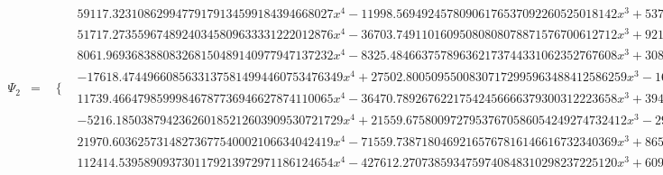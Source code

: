 \documentclass{article}
\begin{document}
\begin{landscape}
\begin{eqnarray*}
\begin{array}{cc}
\end{array}\\
\Psi_2 & = & \begin{array}{cc}
 \{ & 
\begin{array}{cc}
 59117.32310862994779179134599184394668027 x^4-11998.56949245780906176537092260525018142 x^3+537.9721485620369728655932295033721999358 x^2 & x\geq 0\land x<\frac{1}{8} \\
 51717.27355967489240345809633331222012876 x^4-36703.74911016095080808078871576700612712 x^3+9216.349827382961501968515348677776844434 x^2-953.7262380241849926958418077818647374866 x+33.67508518418548236243666551781704649959 & x\geq \frac{1}{8}\land x<\frac{1}{4} \\
 8061.969368388083268150489140977947137232 x^4-8325.484663757896362173744331062352767608 x^3+3089.228153592079377671410303461567859171 x^2-482.6334728738910681981346577849906877924 x+25.96514853070850647407671542865714078579 & x\geq \frac{1}{4}\land x<\frac{3}{8} \\
 -17618.47449660856331375814994460753476349 x^4+27502.80050955008307172995963488412586259 x^3-16161.35263230047433137450426550417233817 x^2+4257.212936828950528279529715421331376529 x-425.9057491741862543579169311125195406829 & x\geq \frac{3}{8}\land x<\frac{1}{2} \\
 11739.46647985999846787736946627874110065 x^4-36470.78926762217542456666379300312223658 x^3+39418.40941247435818311118988835107484621 x^2-18021.32726330096900480145657296161766554 x+2980.251250814312584246010639920656955145 & x\geq \frac{1}{2}\land x<\frac{5}{8} \\
 -5216.185038794236260185212603909530721729 x^4+21559.67580097279537670586054249274732412 x^3-29203.83834734561911306097270415652924566 x^2+16310.28462040004730929612251493189950939 x-3251.807556802560508148460272829205616279 & x\geq \frac{5}{8}\land x<\frac{3}{4} \\
 21970.60362573148273677540002106634042419 x^4-71559.73871804692165767816146616732340369 x^3+86570.21780054603874525613774265245530531 x^2-46089.49347197881779002753982031449052262 x+9107.802578618883118539602298807728706341 & x\geq \frac{3}{4}\land x<\frac{7}{8} \\
 112414.5395890937301179213972971186124654 x^4-427612.2707385934759740848310298237225120 x^3+609294.3653902326510802651923732697697851 x^2-385410.0769210597947099614808455428218957 x+91313.44268032688948585972220497816215725 & x\geq \frac{7}{8}\land x<1
\end{array}


\end{array}
\end{eqnarray*}
\end{landscape}
\end{document}
